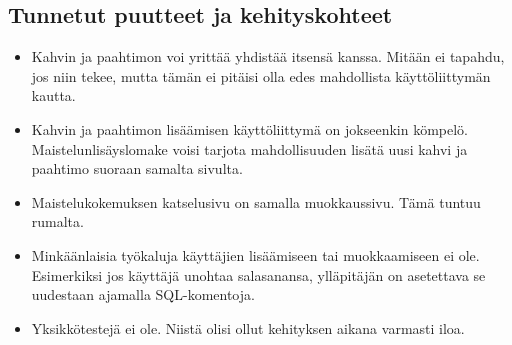 \documentclass[a4paper,titlepage]{article}
\begin{document}
\subsection{Tunnetut puutteet ja kehityskohteet}

\begin{itemize}
\item Kahvin ja paahtimon voi yrittää yhdistää itsensä kanssa. Mitään
  ei tapahdu, jos niin tekee, mutta tämän ei pitäisi olla edes
  mahdollista käyttöliittymän kautta.
\item Kahvin ja paahtimon lisäämisen käyttöliittymä on jokseenkin
  kömpelö. Maistelunlisäyslomake voisi tarjota mahdollisuuden lisätä
  uusi kahvi ja paahtimo suoraan samalta sivulta.
\item Maistelukokemuksen katselusivu on samalla muokkaussivu. Tämä
  tuntuu rumalta.
\item Minkäänlaisia työkaluja käyttäjien lisäämiseen tai muokkaamiseen
  ei ole. Esimerkiksi jos käyttäjä unohtaa salasanansa, ylläpitäjän on
  asetettava se uudestaan ajamalla SQL-komentoja.
\item Yksikkötestejä ei ole. Niistä olisi ollut kehityksen aikana
  varmasti iloa.
\end{itemize}
\end{document}

